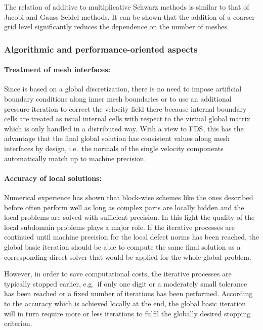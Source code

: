 The relation of additive to multiplicative Schwarz methods is similar to that of Jacobi and Gauss-Seidel methods.
It can be shown that the addition of a coarser grid level significantly reduces the dependence on the number of meshes.

\subsubsection{Algorithmic and performance-oriented aspects}
\label{SEC_SCARC_discussion}

\paragraph{Treatment of mesh interfaces:}
Since \scarc{} is based on a global discretization, there is no need to impose artificial boundary conditions along inner mesh boundaries or 
to use an additional pressure iteration to correct the velocity field there because internal boundary cells are treated as usual internal cells with respect to the virtual global matrix which is only handled in a distributed way. With a view to FDS, this has the advantage that the final global solution has consistent values along mesh interfaces by design, i.e.\ the normals of the single velocity components automatically match up to machine precision.

\paragraph{Accuracy of local solutions:}
Numerical experience has shown that block-wise schemes like the ones described before often perform well as long as complex parts 
are locally hidden and the local problems are solved with sufficient precision. In this light the quality of the local subdomain problems plays a major role. 
If the iterative processes are continued until machine precision for the local defect norms has been reached, the global basic iteration should be able to compute the same final solution as a corresponding direct solver that would be applied for the whole global problem.

However, in order to save computational costs, the iterative processes are typically stopped earlier, e.g.\ if only one digit or a moderately small tolerance has been reached or a fixed number of iterations has been performed.
According to the accuracy which is achieved locally at the end, the global basic iteration will in turn require more or less iterations to fulfil the globally desired stopping criterion. 

